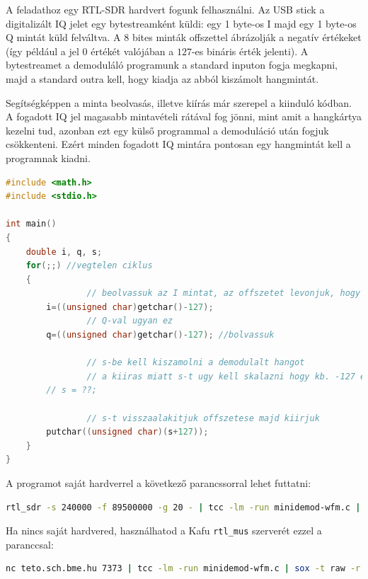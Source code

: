 \documentclass[12pt,a4paper]{article}
\begin{document}
A feladathoz egy RTL-SDR hardvert fogunk felhasználni.
Az USB stick a digitalizált IQ jelet egy bytestreamként küldi: egy 1 byte-os I majd egy 1 byte-os Q mintát küld felváltva.
A 8 bites minták offszettel ábrázolják a negatív értékeket (így például a jel $0$ értékét valójában a $127$-es bináris érték jelenti).
A bytestreamet a demoduláló programunk a standard inputon fogja megkapni, majd a standard outra kell, hogy kiadja az abból kiszámolt hangmintát.

Segítségképpen a minta beolvasás, illetve kiírás már szerepel a kiinduló kódban.
A fogadott IQ jel magasabb mintavételi rátával fog jönni, mint amit a hangkártya kezelni tud, azonban ezt egy külső programmal a demoduláció után fogjuk csökkenteni.
Ezért minden fogadott IQ mintára pontosan egy hangmintát kell a programnak kiadni.

\begin{lstlisting}[frame=single,language=c,caption=Kiinduló kód]
#include <math.h>
#include <stdio.h>

int main()
{
	double i, q, s;
	for(;;) //vegtelen ciklus
	{
                // beolvassuk az I mintat, az offszetet levonjuk, hogy a 0 tenyleg 0 legyen
		i=((unsigned char)getchar()-127); 
                // Q-val ugyan ez
		q=((unsigned char)getchar()-127); //bolvassuk
	
                // s-be kell kiszamolni a demodulalt hangot
                // a kiiras miatt s-t ugy kell skalazni hogy kb. -127 es 128 koze essen.
		// s = ??;

                // s-t visszaalakitjuk offszetese majd kiirjuk
		putchar((unsigned char)(s+127));
	}
}
\end{lstlisting}

\clearpage
A programot saját hardverrel a következő parancssorral lehet futtatni:
\begin{lstlisting}[frame=single,language=bash]
 rtl_sdr -s 240000 -f 89500000 -g 20 - | tcc -lm -run minidemod-wfm.c | sox -t raw -r 240000 -e unsigned -b 8 -c 1 - -t raw - rate 48000 | aplay -f U8 -c1 -r 48000 --buffer-size=200000
\end{lstlisting}

Ha nincs saját hardvered, használhatod a Kafu \texttt{rtl\_mus} szerverét ezzel a paranccsal:
\begin{lstlisting}[frame=single,language=bash]
nc teto.sch.bme.hu 7373 | tcc -lm -run minidemod-wfm.c | sox -t raw -r 240000 -e unsigned -b 8 -c 1 - -t raw - rate 48000 | aplay -f U8 -c1 -r 48000 --buffer-size=200000
\end{lstlisting}
\end{document}
